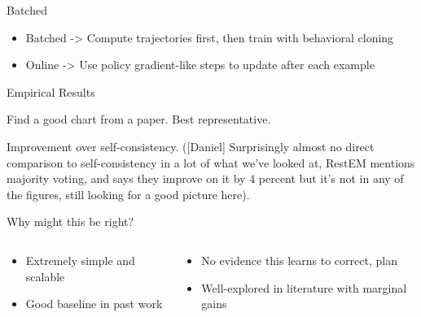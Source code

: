\documentclass[14pt,aspectratio=169]{beamer}
\begin{document}
\begin{frame}{Batched }
	\begin{itemize}
		\item Batched -> Compute trajectories first, then train with behavioral cloning
		\item Online -> Use policy gradient-like steps to update after each example
	\end{itemize}
\end{frame}





\begin{frame}{Empirical Results}

	Find a good chart from a paper.
	Best representative.

	Improvement over self-consistency. ([Daniel] Surprisingly almost no direct comparison to self-consistency in a lot of what we've looked at, RestEM mentions majority voting, and says they improve on it by 4 percent but it's not in any of the figures, still looking for a good picture here).
\end{frame}



\begin{frame}{Why might this be right?}
	\begin{columns}
		\begin{column}{0.5\linewidth}
			\begin{itemize}
				\item Extremely simple and scalable
				\item Good baseline in past work
			\end{itemize}
		\end{column}
		\begin{column}{0.5\linewidth}
			\begin{itemize}
				\item No evidence this learns to correct, plan
				\item Well-explored in literature with marginal gains
			\end{itemize}
		\end{column}
	\end{columns}
\end{frame}
\end{document}
